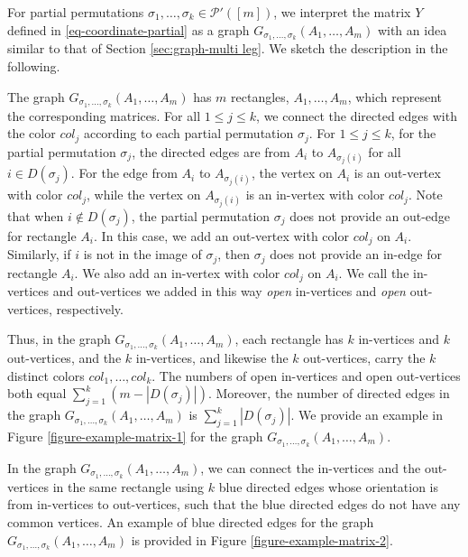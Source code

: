 \documentclass[12pt]{article}
\numberwithin{equation}{section}
\theoremstyle{plain}
\def\cP{\mathcal P}
\begin{document}
For partial permutations $\sigma_1,\ldots,\sigma_k \in \cP'([m])$, we interpret the matrix $Y$ defined in \eqref{eq-coordinate-partial} as a graph $G_{\sigma_1,\ldots,\sigma_k} (A_1,\ldots,A_m)$ with an idea similar to that of Section \ref{sec:graph-multi leg}. We sketch the description in the following.

The graph $G_{\sigma_1,\ldots,\sigma_k} (A_1,\ldots,A_m)$ has $m$ rectangles, $A_1,\ldots,A_m$, which represent the corresponding matrices.
For all $1 \le j \le k$, we connect the directed edges with the color $col_j$ according to each partial permutation $\sigma_j$.
For $1 \le j \le k$, for the partial permutation $\sigma_j$, the directed edges are from $A_i$ to $A_{\sigma_j(i)}$ for all $i \in D(\sigma_j)$.
For the edge from $A_i$ to $A_{\sigma_j(i)}$, the vertex on $A_i$ is an out-vertex with color $col_j$, while the vertex on $A_{\sigma_j(i)}$ is an in-vertex with color $col_j$.
Note that when $i \notin D(\sigma_j)$, the partial permutation $\sigma_j$ does not provide an out-edge for rectangle $A_i$. In this case, we add an out-vertex  with color $col_j$ on $A_i$.
Similarly, if $i$ is not in the image of $\sigma_j$, then $\sigma_j$ does not provide an in-edge for rectangle $A_i$. We also add an in-vertex with color $col_j$ on $A_i$.
We call the in-vertices and out-vertices we added in this way \emph{open} in-vertices and \emph{open} out-vertices, respectively.

Thus, in the graph $G_{\sigma_1,\ldots,\sigma_k} (A_1,\ldots,A_m)$, each rectangle has $k$ in-vertices and $k$ out-vertices, and the $k$ in-vertices, and likewise the $k$ out-vertices, carry the $k$ distinct colors $col_1,\ldots,col_k$.
The numbers of open in-vertices and open out-vertices both equal $\sum_{j=1}^k (m-|D(\sigma_j)|)$.
Moreover, the number of directed edges in the graph $G_{\sigma_1,\ldots,\sigma_k} (A_1,\ldots,A_m)$ is $\sum_{j=1}^k |D(\sigma_j)|$.
We provide an example in Figure \ref{figure-example-matrix-1} for the graph $G_{\sigma_1,\ldots,\sigma_k} (A_1,\ldots,A_m)$.

In the graph $G_{\sigma_1,\ldots,\sigma_k} (A_1,\ldots,A_m)$, we can connect the in-vertices and the out-vertices in the same rectangle using $k$ blue directed edges whose orientation is from in-vertices to out-vertices, such that the blue directed edges do not have any common vertices.
An example of blue directed edges for the graph $G_{\sigma_1,\ldots,\sigma_k} (A_1,\ldots,A_m)$ is provided in Figure \ref{figure-example-matrix-2}.
\end{document}
